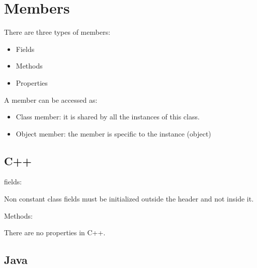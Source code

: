 \documentclass{KodeBook}
\begin{document}






\section{Members}

There are three types of members: 
\begin{itemize}
	\item Fields
	\item Methods
	\item Properties
\end{itemize}

A member can be accessed as: 
\begin{itemize}
	\item Class member: it is shared by all the instances of this class.
	\item Object member: the member is specific to the instance (object)
\end{itemize}


\subsection{C++}

fields: 


Non constant class fields must be initialized outside the header and not inside it. 

 

Methods:





There are no properties in C++.

\subsection{Java}


\end{document}
